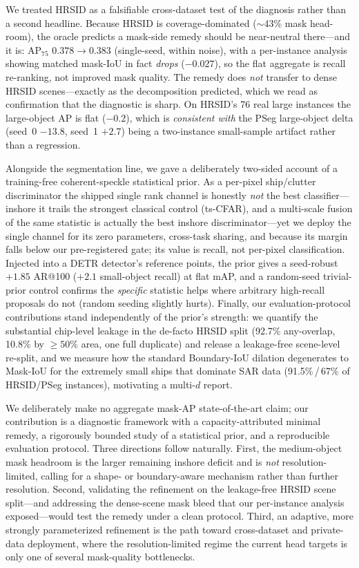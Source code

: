 \documentclass[journal]{IEEEtran}
\begin{document}
We treated HRSID as a falsifiable cross-dataset test of the diagnosis rather than a second headline. Because HRSID is coverage-dominated ($\sim$43\% mask head-room), the oracle predicts a mask-side remedy should be near-neutral there---and it is: AP$_{75}$ $0.378\!\rightarrow\!0.383$ (single-seed, within noise), with a per-instance analysis showing matched mask-IoU in fact \emph{drops} ($-0.027$), so the flat aggregate is recall re-ranking, not improved mask quality. The remedy does \emph{not} transfer to dense HRSID scenes---exactly as the decomposition predicted, which we read as confirmation that the diagnostic is sharp. On HRSID's 76 real large instances the large-object AP is flat ($-0.2$), which is \emph{consistent with} the PSeg large-object delta (seed~0 $-13.8$, seed~1 $+2.7$) being a two-instance small-sample artifact rather than a regression.

Alongside the segmentation line, we gave a deliberately two-sided account of a training-free coherent-speckle statistical prior. As a per-pixel ship/clutter discriminator the shipped single rank channel is honestly \emph{not} the best classifier---inshore it trails the strongest classical control (ts-CFAR), and a multi-scale fusion of the same statistic is actually the best inshore discriminator---yet we deploy the single channel for its zero parameters, cross-task sharing, and because its margin falls below our pre-registered gate; its value is recall, not per-pixel classification. Injected into a DETR detector's reference points, the prior gives a seed-robust $+1.85$ AR@100 ($+2.1$ small-object recall) at flat mAP, and a random-seed trivial-prior control confirms the \emph{specific} statistic helps where arbitrary high-recall proposals do not (random seeding slightly hurts). Finally, our evaluation-protocol contributions stand independently of the prior's strength: we quantify the substantial chip-level leakage in the de-facto HRSID split (92.7\% any-overlap, 10.8\% by $\ge\!50\%$ area, one full duplicate) and release a leakage-free scene-level re-split, and we measure how the standard Boundary-IoU dilation degenerates to Mask-IoU for the extremely small ships that dominate SAR data (91.5\%\,/\,67\% of HRSID/PSeg instances), motivating a multi-$d$ report.

We deliberately make no aggregate mask-AP state-of-the-art claim; our contribution is a diagnostic framework with a capacity-attributed minimal remedy, a rigorously bounded study of a statistical prior, and a reproducible evaluation protocol. Three directions follow naturally. First, the medium-object mask headroom is the larger remaining inshore deficit and is \emph{not} resolution-limited, calling for a shape- or boundary-aware mechanism rather than further resolution. Second, validating the refinement on the leakage-free HRSID scene split---and addressing the dense-scene mask bleed that our per-instance analysis exposed---would test the remedy under a clean protocol. Third, an adaptive, more strongly parameterized refinement is the path toward cross-dataset and private-data deployment, where the resolution-limited regime the current head targets is only one of several mask-quality bottlenecks.



\end{document}
